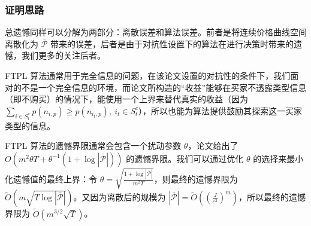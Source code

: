 \subsubsection{证明思路}

总遗憾同样可以分解为两部分：离散误差和算法误差。前者是将连续价格曲线空间离散化为 $\bar{\mathcal{P}}$ 带来的误差，后者是由于对抗性设置下的算法在进行决策时带来的遗憾，我们更多的关注后者。

FTPL 算法通常用于完全信息的问题，在该论文设置的对抗性的条件下，我们面对的不是一个完全信息的环境，而论文所构造的“收益”能够在买家不透露类型信息（即不购买）的情况下，能使用一个上界来替代真实的收益（因为 $\sum_{i \in S_t^c} p(n_{i,p}) \geqslant p(n_{i_t,p}) ,\ i_t \in S_t^c$），所以也能为算法提供鼓励其探索这一买家类型的信息。

FTPL 算法的遗憾界限通常会包含一个扰动参数 $\theta$，论文给出了 $O(m^2 \theta T + \theta^{-1}(1+\log |\bar{\mathcal{P}}|))$ 的遗憾界限。我们可以通过优化 $\theta$ 的选择来最小化遗憾值的最终上界：令 $\theta = \sqrt{\frac{1+\log |\bar{\mathcal{P}}|}{m^2 T}}$，则最终的遗憾界限为 $\tilde{O}(m\sqrt{T \log |\bar{\mathcal{P}}|})$。又因为离散后的规模为 $|\bar{\mathcal{P}}| = \tilde{O}\left(\left( \frac{J}{\varepsilon^3} \right)^m \right)$，所以最终的遗憾界限为 $\tilde{O}(m^{3/2}\sqrt{T})$。
